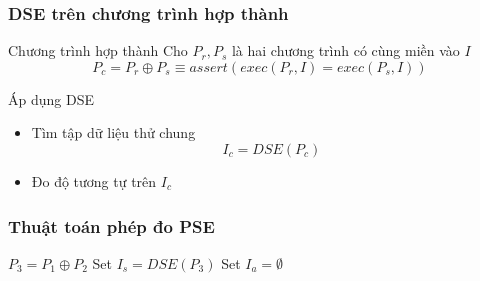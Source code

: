 \documentclass{beamer}
\begin{document}

\begin{frame}
\frametitle{DSE trên chương trình hợp thành}
\begin{block}{Chương trình hợp thành}
Cho $ P_{r}, P_{s} $ là hai chương trình có cùng miền vào $ I $
\[ P_{c} = P_{r} \oplus P_{s} \equiv assert(exec(P_{r}, I) = exec(P_{s}, I)) \]
\end{block}
\begin{block}{Áp dụng DSE}
\begin{itemize}
	\item Tìm tập dữ liệu thử chung 
	\[ I_{c} = DSE(P_{c}) \]
	\item Đo độ tương tự trên $ I_c $
\end{itemize}
\end{block}
\end{frame}

\begin{frame}
  \frametitle{Thuật toán phép đo PSE}
  \begin{algorithm}[H]
  	$P_{3} = P_1 \oplus P_2$\;
  	Set $I_{s} = DSE(P_{3})$ \;
  	Set $I_{a} = \emptyset$ \;
  	{  			
  	}
  \end{algorithm}
\end{frame}
\end{document}
